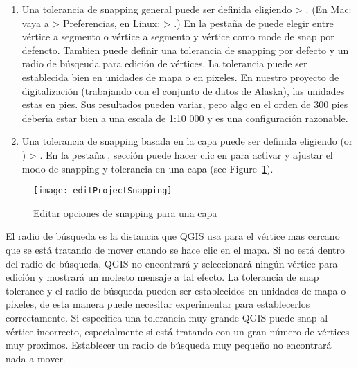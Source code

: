 \begin{enumerate}
\item Una tolerancia de snapping general puede ser definida eligiendo
 > . 
(En Mac: vaya a   > Preferencias, en Linux:  > .)
En la pesta\~na de  puede elegir entre v\'ertice a segmento o v\'ertice a
segmento y v\'ertice como mode de snap por defencto. Tambien puede definir una tolerancia de
snapping por defecto y un radio de b\'usqeuda para edici\'on de v\'ertices. La tolerancia puede ser establecida bien
en unidades de mapa o en pixeles.
En nuestro proyecto de digitalizaci\'on (trabajando con el conjunto de datos de Alaska),
las unidades estas en pies. Sus resultados pueden variar, pero algo en el
orden de 300 pies deber\'{\i}a estar bien a una escala de 1:10 000 y es una configuraci\'on razonable.
\item Una tolerancia de snapping basada en la capa puede ser definida eligiendo
 (or ) > . En la pesta\~na , secci\'on  puede hacer clic
en  para activar y ajustar el modo de snapping
y tolerancia en una capa (see Figure~\ref{fig:snappingoptions}).
\end{enumerate}

\begin{figure}[H]
   \begin{center}
   \caption{Editar opciones de snapping para una capa \nixcaption}\label{fig:snappingoptions}\smallskip
   \texttt{[image: editProjectSnapping]} 
\end{center}  
\end{figure}


El radio de b\'usqueda es la distancia que QGIS usa para  el v\'ertice
mas cercano que se est\'a tratando de mover cuando se hace clic en el
mapa. Si no est\'a dentro del radio de b\'usqueda, QGIS no encontrar\'a y seleccionar\'a
ning\'un v\'ertice para edici\'on y mostrar\'a un molesto mensaje a tal efecto.
La tolerancia de snap tolerance y el radio de b\'usqueda pueden ser establecidos en unidades de mapa o pixeles, de esta manera puede
necesitar experimentar para establecerlos correctamente. Si especifica una tolerancia muy grande
QGIS puede snap al v\'ertice incorrecto, especialmente si est\'a tratando
con un gran n\'umero de v\'ertices muy proximos. Establecer un radio de b\'usqueda muy
peque\~no no encontrar\'a nada a mover.

